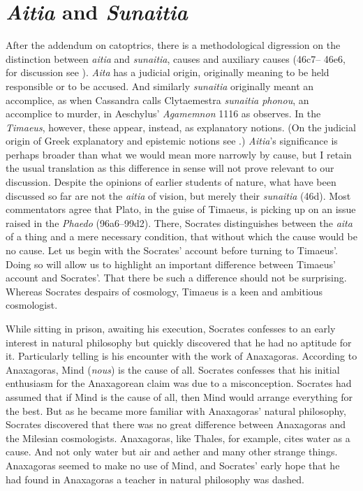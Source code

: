 
\section{\emph{Aitia} and \emph{Sunaitia}} %
\label{sec:_emph_aitia_and_emph_sunaitia}

After the addendum on catoptrics, there is a methodological digression on the distinction between \emph{aitia} and \emph{sunaitia}, causes and auxiliary causes (46c7–
46e6, for discussion see \citealt{Strange:1985aa}). \emph{Aita} has a judicial origin, originally meaning to be held responsible or to be accused. And similarly \emph{sunaitia} originally meant an accomplice, as when Cassandra calls Clytaemestra \emph{sunaitia phonou}, an accomplice to murder, in Aeschylus' \emph{Agamemnon} 1116 as \citet[291]{Taylor:1928qb} observes. In the \emph{Timaeus}, however, these appear, instead, as explanatory notions. (On the judicial origin of Greek explanatory and epistemic notions see \citealt[chapter 4]{Lloyd:1979lc}.) \emph{Aitia}'s significance is perhaps broader than what we would mean more narrowly by cause, but I retain the usual translation as this difference in sense will not prove relevant to our discussion. Despite the opinions of earlier students of nature, what have been discussed so far are not the \emph{aitia} of vision, but merely their \emph{sunaitia} (46d). Most commentators agree that Plato, in the guise of Timaeus, is picking up on an issue raised in the \emph{Phaedo} (96a6--99d2). There, Socrates distinguishes between the \emph{aita} of a thing and a mere necessary condition, that without which the cause would be no cause. Let us begin with the Socrates' account before turning to Timaeus'. Doing so will allow us to highlight an important difference between Timaeus' account and Socrates'. That there be such a difference should not be surprising. Whereas Socrates despairs of cosmology, Timaeus is a keen and ambitious cosmologist.

While sitting in prison, awaiting his execution, Socrates confesses to an early interest in natural philosophy but quickly discovered that he had no aptitude for it. Particularly telling is his encounter with the work of Anaxagoras. According to Anaxagoras, Mind (\emph{nous}) is the cause of all. Socrates confesses that his initial enthusiasm for the Anaxagorean claim was due to a misconception. Socrates had assumed that if Mind is the cause of all, then Mind would arrange everything for the best. But as he became more familiar with Anaxagoras' natural philosophy, Socrates discovered that there was no great difference between Anaxagoras and the Milesian cosmologists. Anaxagoras, like Thales, for example, cites water as a cause. And not only water but air and aether and many other strange things. Anaxagoras seemed to make no use of Mind, and Socrates' early hope that he had found in Anaxagoras a teacher in natural philosophy was dashed. 

